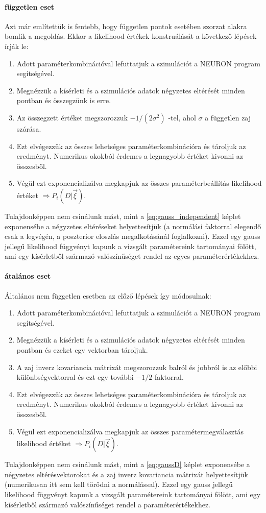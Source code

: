  \paragraph{független eset}
Azt már említettük is fentebb, hogy független pontok esetében szorzat alakra bomlik a megoldás. Ekkor a likelihood értékek konstruálását a következő lépések írják le:
\begin{enumerate}\label{meth:independet}
	\item Adott paraméterkombinációval lefuttatjuk a szimulációt a NEURON program segítségével.
	\item Megnézzük a kísérleti és a szimulációs adatok négyzetes eltérését minden pontban és összegzünk is erre.
	\item Az összegzett értéket megszorozzuk $-1/(2 \sigma^2)$ -tel, ahol $\sigma$ a független zaj szórása.
	\item Ezt elvégezzük az összes lehetséges paraméterkombinációra és tároljuk az eredményt. Numerikus okokból érdemes a legnagyobb értéket kivonni az összesből.
	\item Végül ezt exponencializálva megkapjuk az összes paraméterbeállítás likelihood értéket $\Rightarrow P_i(D|\vec{\xi})$.
\end{enumerate}
Tulajdonképpen nem csinálunk mást, mint a \ref{eq:gauss_independent} képlet exponensébe a négyzetes eltéréseket helyettesítjük (a normálási faktorral elegendő csak a legvégén, a poszterior eloszlás megalkotásánál foglalkozni). Ezzel egy gauss jellegű likelihood függvényt kapunk a vizsgált paramétereink tartományai fölött, ami egy kísérletből származó valószínűséget rendel az egyes paraméterértékekhez.

\paragraph{átalános eset}
Általános nem független esetben az előző lépések így módosulnak:
\begin{enumerate}\label{meth:dependet}
	\item Adott paraméterkombinációval lefuttatjuk a szimulációt a NEURON program segítségével.
	\item Megnézzük a kísérleti és a szimulációs adatok négyzetes eltérését minden pontban és ezeket egy vektorban tároljuk.
	\item A zaj inverz kovariancia mátrixát megszorozzuk balról és jobbról is az előbbi különbségvektorral és ezt egy további $-1/2$ faktorral.
	\item Ezt elvégezzük az összes lehetséges paraméterkombinációra és tároljuk az eredményt. Numerikus okokból érdemes a legnagyobb értéket kivonni az összesből.
	\item Végül ezt exponencializálva megkapjuk az összes paramétermegválasztás likelihood értéket $\Rightarrow P_i(D|\vec{\xi})$.
\end{enumerate}
Tulajdonképpen nem csinálunk mást, mint a \ref{eq:gaussD} képlet exponensébe a négyzetes eltérésvektorokat és a zaj inverz kovariancia mátrixát helyettesítjük (numerikusan itt sem kell törődni a normálással). Ezzel egy gauss jellegű likelihood függvényt kapunk a vizsgált paramétereink tartományai fölött, ami egy kísérletből származó valószínűséget rendel a paraméterértékekhez.

